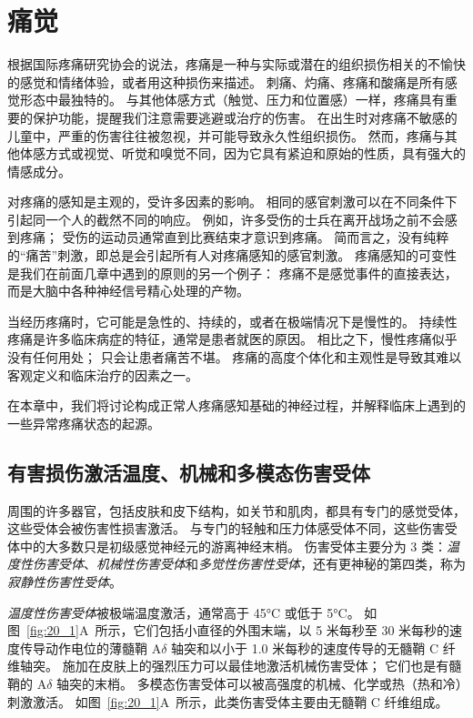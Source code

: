\chapter{痛觉} \label{chap:chap20}

根据国际疼痛研究协会的说法，疼痛是一种与实际或潜在的组织损伤相关的不愉快的感觉和情绪体验，或者用这种损伤来描述。
刺痛、灼痛、疼痛和酸痛是所有感觉形态中最独特的。
与其他体感方式（触觉、压力和位置感）一样，疼痛具有重要的保护功能，提醒我们注意需要逃避或治疗的伤害。 
在出生时对疼痛不敏感的儿童中，严重的伤害往往被忽视，并可能导致永久性组织损伤。
然而，疼痛与其他体感方式或视觉、听觉和嗅觉不同，因为它具有紧迫和原始的性质，具有强大的情感成分。



对疼痛的感知是主观的，受许多因素的影响。
相同的感官刺激可以在不同条件下引起同一个人的截然不同的响应。
例如，许多受伤的士兵在离开战场之前不会感到疼痛；
受伤的运动员通常直到比赛结束才意识到疼痛。
简而言之，没有纯粹的“痛苦”刺激，即总是会引起所有人对疼痛感知的感官刺激。
疼痛感知的可变性是我们在前面几章中遇到的原则的另一个例子：
疼痛不是感觉事件的直接表达，而是大脑中各种神经信号精心处理的产物。


当经历疼痛时，它可能是急性的、持续的，或者在极端情况下是慢性的。
持续性疼痛是许多临床病症的特征，通常是患者就医的原因。
相比之下，慢性疼痛似乎没有任何用处；
只会让患者痛苦不堪。
疼痛的高度个体化和主观性是导致其难以客观定义和临床治疗的因素之一。


在本章中，我们将讨论构成正常人疼痛感知基础的神经过程，并解释临床上遇到的一些异常疼痛状态的起源。



\section{有害损伤激活温度、机械和多模态伤害受体}

周围的许多器官，包括皮肤和皮下结构，如关节和肌肉，都具有专门的感觉受体，这些受体会被伤害性损害激活。
与专门的轻触和压力体感受体不同，这些伤害受体中的大多数只是初级感觉神经元的游离神经末梢。
伤害受体主要分为 3 类：\textit{温度性伤害受体}、\textit{机械性伤害受体}和\textit{多觉性伤害性受体}，还有更神秘的第四类，称为\textit{寂静性伤害性受体}。


\textit{温度性伤害受体}被极端温度激活，通常高于 45°C 或低于 5°C。
如图~\ref{fig:20_1}A~所示，它们包括小直径的外围末端，以 5 米每秒至 30 米每秒的速度传导动作电位的薄髓鞘 A$\delta$ 轴突和以小于 1.0 米每秒的速度传导的无髓鞘 C 纤维轴突。
施加在皮肤上的强烈压力可以最佳地激活机械伤害受体；
它们也是有髓鞘的 A$\delta$ 轴突的末梢。
多模态伤害受体可以被高强度的机械、化学或热（热和冷）刺激激活。
如图~\ref{fig:20_1}A~所示，此类伤害受体主要由无髓鞘 C 纤维组成。


